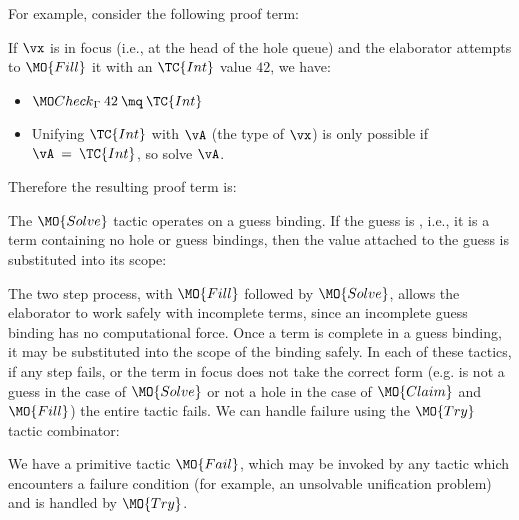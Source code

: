 \noindent
For example, consider the following proof term:

\DM{
\AR{
\hole{\vA}{\Type}\SC\hole{\vk}{\Nat}\SC
\hole{\vx}{\vA}\SC\hole{\vxs}{\Vect\:\vA\:\vk}\SC
\\
\hole{\vys}{\Vect\:\vA\:(\suc\:\vk)}\SC\vys
}
}

\noindent
If $\vx$ is in focus (i.e., at the head of the hole queue) and the elaborator
attempts to
$\MO{Fill}$ it with an $\TC{Int}$ value $42$, we have:

\begin{itemize}
\item $\Check\:42\:\mq\:\TC{Int}$
\item Unifying $\TC{Int}$ with $\vA$ (the type of $\vx$) is only possible if
$\vA\:=\:\TC{Int}$, so solve $\vA$.
\end{itemize}

\noindent
Therefore the resulting proof term is:


The $\MO{Solve}$ tactic operates on a guess binding. If the guess is , i.e., it
is a \TT{} term containing no hole or guess bindings, then the value attached to
the guess is substituted into its scope:


The two step process, with $\MO{Fill}$ followed by $\MO{Solve}$, allows the elaborator
to work safely with incomplete terms, since an incomplete guess binding has no 
computational force. Once a term is complete in a guess binding, it may be substituted into the 
scope of the binding safely.
In each of these tactics, if any step fails, or the term in focus does not take
the correct form (e.g. is not a guess in the case of $\MO{Solve}$ or not a hole
in the case of $\MO{Claim}$ and $\MO{Fill}$) the entire tactic fails. We can
handle failure using the $\MO{Try}$ tactic combinator:


We have a primitive tactic $\MO{Fail}$, which may be invoked by
any tactic which encounters a failure condition (for example, an unsolvable unification
problem) and is handled by $\MO{Try}$.

